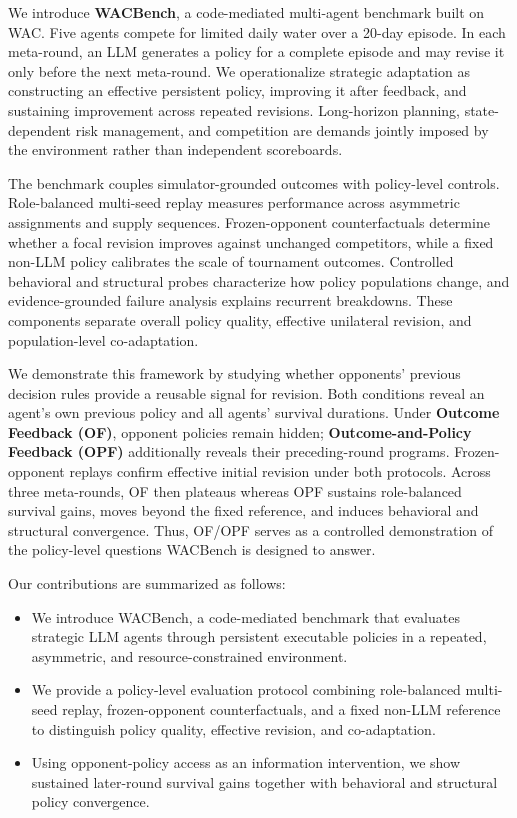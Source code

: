 \documentclass[letterpaper]{article} %
\begin{document}
We introduce \textbf{WACBench}, a code-mediated multi-agent benchmark built
on WAC. Five agents compete for limited daily water over a 20-day episode.
In each meta-round, an LLM generates a policy for a complete episode and may
revise it only before the next meta-round. We operationalize strategic
adaptation as constructing an effective persistent policy, improving it after
feedback, and sustaining improvement across repeated revisions. Long-horizon
planning, state-dependent risk management, and competition are demands
jointly imposed by the environment rather than independent scoreboards.

The benchmark couples simulator-grounded outcomes with policy-level controls.
Role-balanced multi-seed replay measures performance across asymmetric
assignments and supply sequences. Frozen-opponent counterfactuals determine
whether a focal revision improves against unchanged competitors, while a
fixed non-LLM policy calibrates the scale of tournament outcomes. Controlled
behavioral and structural probes characterize how policy populations change,
and evidence-grounded failure analysis explains recurrent breakdowns. These
components separate overall policy quality, effective unilateral revision,
and population-level co-adaptation.

We demonstrate this framework by studying whether opponents' previous
decision rules provide a reusable signal for revision. Both conditions reveal
an agent's own previous policy and all agents' survival durations. Under
\textbf{Outcome Feedback (OF)}, opponent policies remain hidden;
\textbf{Outcome-and-Policy Feedback (OPF)} additionally reveals their
preceding-round programs. Frozen-opponent replays confirm effective initial
revision under both protocols. Across three meta-rounds, OF then plateaus
whereas OPF sustains role-balanced survival gains, moves beyond the fixed
reference, and induces behavioral and structural convergence. Thus, OF/OPF
serves as a controlled demonstration of the policy-level questions WACBench
is designed to answer.

Our contributions are summarized as follows:

\begin{itemize}
    \item We introduce WACBench, a code-mediated benchmark that evaluates
    strategic LLM agents through persistent executable policies in a
    repeated, asymmetric, and resource-constrained environment.
    
    \item We provide a policy-level evaluation protocol combining
    role-balanced multi-seed replay, frozen-opponent counterfactuals, and a
    fixed non-LLM reference to distinguish policy quality, effective
    revision, and co-adaptation.
    
    \item Using opponent-policy access as an information intervention, we
    show sustained later-round survival gains together with behavioral and
    structural policy convergence.
\end{itemize}
\end{document}

